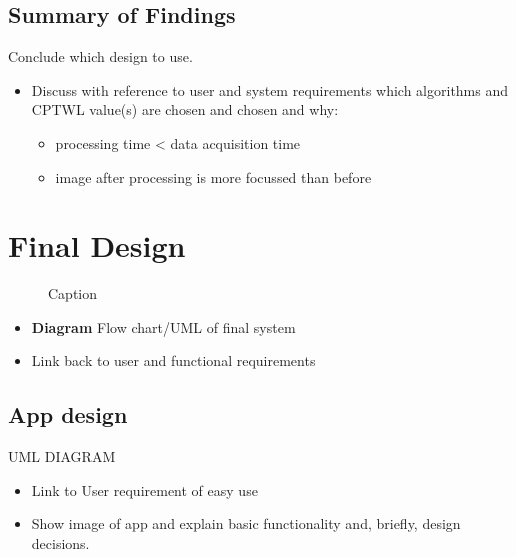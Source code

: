 \documentclass[class=report,11pt,crop=false]{standalone}
\begin{document}
    


    \subsection{Summary of Findings}
    Conclude which design to use.

\begin{itemize}
    \item Discuss with reference to user and system requirements which algorithms and CPTWL value(s) are chosen and chosen and why:
    \begin{itemize}
        \item processing time < data acquisition time
        \item image after processing is more focussed than before
    \end{itemize}
\end{itemize} 

\section{Final Design}
\begin{figure}[H]
    \centering
    \caption{Caption}
    \label{fig:enter-label}
\end{figure}

\begin{itemize}
    \item \textbf{Diagram} Flow chart/UML of final system
    \item Link back to user and functional requirements
\end{itemize}
\subsection{App design}
UML DIAGRAM
\begin{itemize}
    \item Link to User requirement of easy use
    \item Show image of app and explain basic functionality and, briefly, design decisions.
\end{itemize}

\ifstandalone

\printnoidxglossary[type=\acronymtype,nonumberlist]
\fi
\end{document}
